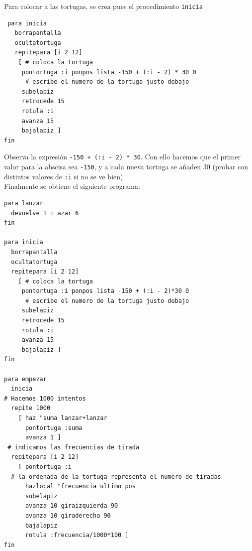 \documentclass[12pt,twoside,spanish,a4paper]{report}
\begin{document}
\noindent Para colocar a las tortugas, se crea pues el procedimiento 
\texttt{inicia}
\begin{verbatim}
 para inicia
   borrapantalla
   ocultatortuga
   repitepara [i 2 12]
    [ # coloca la tortuga
     pontortuga :i ponpos lista -150 + (:i - 2) * 30 0
      # escribe el numero de la tortuga justo debajo
     subelapiz
     retrocede 15
     rotula :i
     avanza 15
     bajalapiz ]
fin \end{verbatim}

Observa la expresi\'on \texttt{-150 + (:i - 2) * 30}. Con ello hacemos que el
primer valor para la abscisa sea \texttt{-150}, y a cada nueva tortuga se
a\~naden 30 (probar con distintos valores de \texttt{:i} si no se ve bien). \\

\noindent Finalmente se obtiene el siguiente programa:
\begin{verbatim}
para lanzar
  devuelve 1 + azar 6
fin

para inicia
  borrapantalla
  ocultatortuga
  repitepara [i 2 12]
    [ # coloca la tortuga
     pontortuga :i ponpos lista -150 + (:i - 2)*30 0
      # escribe el numero de la tortuga justo debajo
     subelapiz
     retrocede 15
     rotula :i
     avanza 15
     bajalapiz ]
fin

para empezar
  inicia
# Hacemos 1000 intentos
  repite 1000
    [ haz "suma lanzar+lanzar
      pontortuga :suma 
      avanza 1 ]
 # indicamos las frecuencias de tirada
  repitepara [i 2 12]
    [ pontortuga :i
  # la ordenada de la tortuga representa el numero de tiradas
      hazlocal "frecuencia ultimo pos 
      subelapiz
      avanza 10 giraizquierda 90
      avanza 10 giraderecha 90
      bajalapiz
      rotula :frecuencia/1000*100 ]
fin \end{verbatim}
\end{document}

